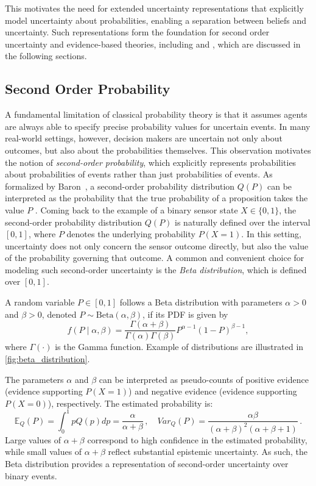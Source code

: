 This motivates the need for extended uncertainty representations that explicitly model uncertainty about probabilities, enabling a separation between beliefs and uncertainty. Such representations form the foundation for second order uncertainty and evidence-based theories, including  and , which are discussed in the following sections.

\subsection{Second Order Probability}

A fundamental limitation of classical probability theory is that it assumes agents are always able to specify precise probability values for uncertain events. In many real-world settings, however, decision makers are uncertain not only about outcomes, but also about the probabilities themselves. This observation motivates the notion of \emph{second-order probability}, which explicitly represents probabilities about probabilities of events rather than just probabilities of events. As formalized by Baron~\cite{Baron1987}, a second-order probability distribution \( Q(P) \) can be interpreted as the probability that the true probability of a proposition takes the value \( P \) . Coming back to the example of a binary sensor state \(X \in \{0,1\}\), the second-order probability distribution \( Q(P) \) is naturally defined over the interval \([0,1]\), where \(P\) denotes the underlying probability \(P(X=1)\). In this setting, uncertainty does not only concern the sensor outcome directly, but also the value of the probability governing that outcome. A common and convenient choice for modeling such second-order uncertainty is the \emph{Beta distribution}, which is defined over \([0,1]\).

\begin{definition}
\label{def:beta}
A random variable \(P \in [0,1]\) follows a Beta distribution with parameters \(\alpha > 0\) and \(\beta > 0\), denoted \(P \sim \mathrm{Beta}(\alpha,\beta)\), if its \ac{PDF} is given by
\[
f(P \mid \alpha, \beta) = \frac{\Gamma(\alpha+\beta)}{\Gamma(\alpha)\Gamma(\beta)} P^{\alpha-1}(1-P)^{\beta-1},
\]
where \(\Gamma(\cdot)\) is the Gamma function. Example of distributions are illustrated in \cref{fig:beta_distribution}.
\end{definition}

The parameters \(\alpha\) and \(\beta\) can be interpreted as pseudo-counts of positive evidence (evidence supporting \(P(X=1)\)) and negative evidence (evidence supporting \(P(X=0)\)), respectively. The estimated probability is:
\[\mathbb{E}_Q (P) = \int_0^1 p Q(p) dp = \frac{\alpha}{\alpha + \beta} \, , \quad Var_Q (P) = \frac{\alpha \beta}{(\alpha + \beta)^2 (\alpha+\beta+1)} \, . \]
Large values of \(\alpha+\beta\) correspond to high confidence in the estimated probability, while small values of \(\alpha+\beta\) reflect substantial epistemic uncertainty. As such, the Beta distribution provides a representation of second-order uncertainty over binary events.

